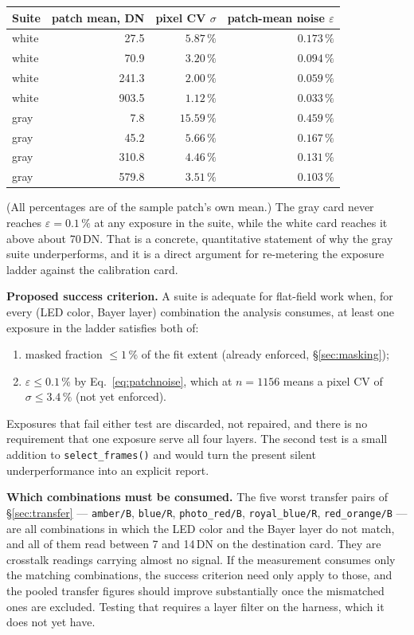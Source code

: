 \documentclass[11pt, a4paper]{article}
\newcommand{\code}[1]{\texttt{#1}}
\newcommand{\pct}{\,\%}
\begin{document}
\begin{center}
\begin{tabular}{lrrr}
\toprule
Suite & patch mean, DN & pixel CV $\sigma$ & patch-mean noise $\varepsilon$ \\
\midrule
white & 27.5  & $5.87\pct$ & $0.173\pct$ \\
white & 70.9  & $3.20\pct$ & $0.094\pct$ \\
white & 241.3 & $2.00\pct$ & $0.059\pct$ \\
white & 903.5 & $1.12\pct$ & $0.033\pct$ \\
\midrule
gray  & 7.8   & $15.59\pct$ & $0.459\pct$ \\
gray  & 45.2  & $5.66\pct$  & $0.167\pct$ \\
gray  & 310.8 & $4.46\pct$  & $0.131\pct$ \\
gray  & 579.8 & $3.51\pct$  & $0.103\pct$ \\
\bottomrule
\end{tabular}
\end{center}

(All percentages are of the sample patch's own mean.)
The gray card never reaches $\varepsilon = 0.1\pct$ at any exposure
in the suite,
while the white card reaches it above about 70\,DN.
That is a concrete, quantitative statement of why the gray suite
underperforms,
and it is a direct argument for re-metering the exposure ladder
against the calibration card.

\textbf{Proposed success criterion.}
A suite is adequate for flat-field work when,
for every (LED color, Bayer layer) combination the analysis consumes,
at least one exposure in the ladder satisfies both of:

\begin{enumerate}[nosep]
  \item masked fraction $\le 1\pct$ of the fit extent
        (already enforced, \S\ref{sec:masking});
  \item $\varepsilon \le 0.1\pct$ by Eq.~\ref{eq:patchnoise},
        which at $n = 1156$ means a pixel CV of $\sigma \le 3.4\pct$
        (not yet enforced).
\end{enumerate}

Exposures that fail either test are discarded, not repaired,
and there is no requirement that one exposure serve all four layers.
The second test is a small addition to \code{select\_frames()}
and would turn the present silent underperformance
into an explicit report.

\textbf{Which combinations must be consumed.}
The five worst transfer pairs of \S\ref{sec:transfer} ---
\code{amber/B}, \code{blue/R}, \code{photo\_red/B},
\code{royal\_blue/R}, \code{red\_orange/B} ---
are all combinations in which the LED color and the Bayer layer
do not match,
and all of them read between 7 and 14\,DN on the destination card.
They are crosstalk readings carrying almost no signal.
If the measurement consumes only the matching combinations,
the success criterion need only apply to those,
and the pooled transfer figures should improve substantially
once the mismatched ones are excluded.
Testing that requires a layer filter on the harness,
which it does not yet have.
\end{document}
